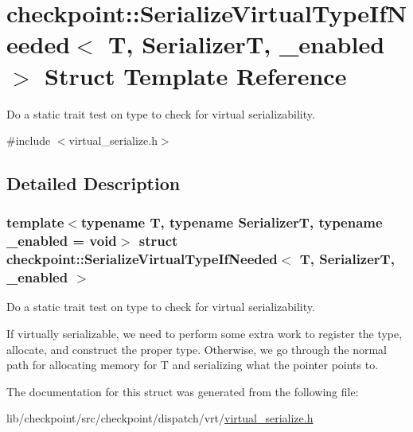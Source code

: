 \hypertarget{structcheckpoint_1_1_serialize_virtual_type_if_needed}{}\section{checkpoint\+:\+:Serialize\+Virtual\+Type\+If\+Needed$<$ T, SerializerT, \+\_\+enabled $>$ Struct Template Reference}
\label{structcheckpoint_1_1_serialize_virtual_type_if_needed}


Do a static trait test on type to check for virtual serializability.  




{\ttfamily \#include $<$virtual\+\_\+serialize.\+h$>$}



\subsection{Detailed Description}
\subsubsection*{template$<$typename T, typename SerializerT, typename \+\_\+enabled = void$>$\newline
struct checkpoint\+::\+Serialize\+Virtual\+Type\+If\+Needed$<$ T, Serializer\+T, \+\_\+enabled $>$}

Do a static trait test on type to check for virtual serializability. 

If virtually serializable, we need to perform some extra work to register the type, allocate, and construct the proper type. Otherwise, we go through the normal path for allocating memory for T and serializing what the pointer points to. 

The documentation for this struct was generated from the following file\+:\begin{DoxyCompactItemize}
\item 
lib/checkpoint/src/checkpoint/dispatch/vrt/\hyperlink{virtual__serialize_8h}{virtual\+\_\+serialize.\+h}\end{DoxyCompactItemize}
